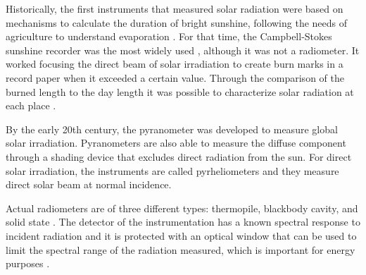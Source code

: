 Historically, the first instruments that measured solar radiation were based on mechanisms to calculate the duration of bright sunshine, following the needs of agriculture to understand evaporation \cite*{sengupta2017best}. For that time, the Campbell-Stokes sunshine recorder was the most widely used \cite*{sengupta2017best}, although it was not a radiometer. It worked focusing the direct beam of solar irradiation to create burn marks in a record paper when it exceeded a certain value. Through the comparison of the burned length to the day length it was possible to characterize solar radiation at each place \cite*{Iqbal2012Introduction}.

By the early 20th century, the pyranometer was developed to measure global solar irradiation. Pyranometers are also able to measure the diffuse component through a shading device that excludes direct radiation from the sun. For direct solar irradiation, the instruments are called pyrheliometers and they measure direct solar beam at normal incidence.
 
Actual radiometers are of three different types: thermopile, blackbody cavity, and solid state \cite*{Gueymard2008}. The detector of the instrumentation has a known spectral response to incident radiation and it is protected with an optical window that can be used to limit the spectral range of the radiation measured, which is important for energy purposes \cite*{Gueymard2008}. 


